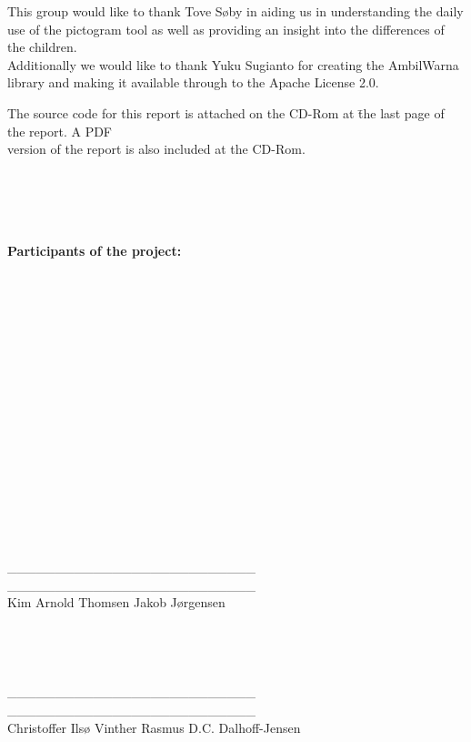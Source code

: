 This group would like to thank Tove S\o{}by in aiding us in understanding the daily use of the pictogram tool as well as providing an insight into the differences of the children.\\
Additionally we would like to thank Yuku Sugianto for creating the AmbilWarna library and making it available through to the Apache License 2.0. \cite{ambilw} 

  

\begin{tabbing}


The source code for this report is attached on the CD-Rom at \= the last page of the report. A PDF \\
version of the report is also included at the CD-Rom.

\\ \\ \\ \\ 

\textbf{Participants of the project:}

\\ \\ \\ \\ \\ \\ \\ \\ \\ \\ \\ \\ \\ \\ \\ \\
\_\_\_\_\_\_\_\_\_\_\_\_\_\_\_\_\_\_\_\_\_\_\_\_\_\_ \> \_\_\_\_\_\_\_\_\_\_\_\_\_\_\_\_\_\_\_\_\_\_\_\_\_\_
\\
Kim Arnold Thomsen \> Jakob J\o{}rgensen\\ \\ \\
\\
\\
\_\_\_\_\_\_\_\_\_\_\_\_\_\_\_\_\_\_\_\_\_\_\_\_\_\_  \> \_\_\_\_\_\_\_\_\_\_\_\_\_\_\_\_\_\_\_\_\_\_\_\_\_\_
\\
Christoffer Ils\o{} Vinther \> Rasmus D.C. Dalhoff-Jensen\\ \\ \\
\\

\end{tabbing}
